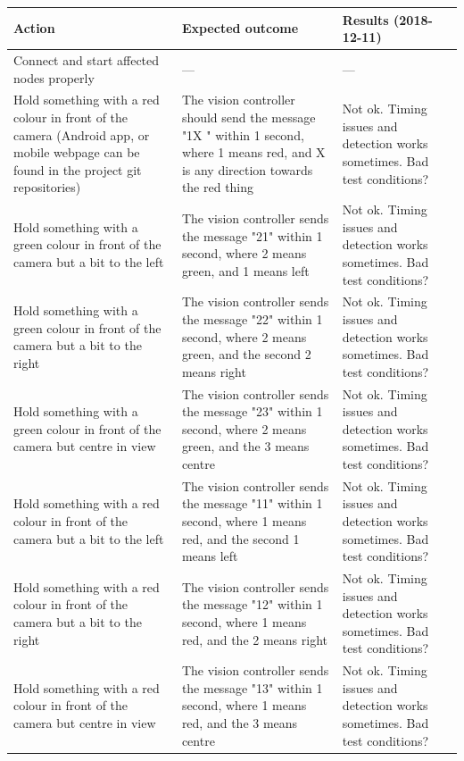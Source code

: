 \documentclass[11pt, titlepage]{article} %
\begin{document}
\begin{table}[H]
 \label{tab:title}
\centering
\begin{tabular}{|m{5cm}|m{5cm}|m{5cm}|}
\hline
Action & Expected outcome & Results (2018-12-11) \\ \hline
Connect and start affected nodes properly  &  ---     & ---  \\ \hline
Hold something with a red colour in front of the camera (Android app, or mobile webpage can be found in the project git repositories)  & The vision controller should send the message "1X " within 1 second, where 1 means red, and X is any direction towards the red thing      & Not ok. Timing issues and detection works sometimes. Bad test conditions?  \\ \hline
Hold something with a green colour in front of the camera but a bit to the left  & The vision controller sends the message "21" within 1 second, where 2 means green, and 1 means left      & Not ok. Timing issues and detection works sometimes. Bad test conditions?  \\ \hline
Hold something with a green colour in front of the camera but a bit to the right  & The vision controller sends the message "22" within 1 second, where 2 means green, and the second 2 means right     & Not ok. Timing issues and detection works sometimes. Bad test conditions?  \\ \hline
Hold something with a green colour in front of the camera but centre in view  & The vision controller sends the message "23" within 1 second, where 2 means green, and the 3 means centre      & Not ok. Timing issues and detection works sometimes. Bad test conditions?  \\ \hline
Hold something with a red colour in front of the camera but a bit to the left  & The vision controller sends the message "11" within 1 second, where 1 means red, and the second 1 means left      & Not ok. Timing issues and detection works sometimes. Bad test conditions?  \\ \hline
Hold something with a red colour in front of the camera but a bit to the right  & The vision controller sends the message "12" within 1 second, where 1 means red, and the 2 means right      & Not ok. Timing issues and detection works sometimes. Bad test conditions?  \\ \hline
Hold something with a red colour in front of the camera but centre in view  &  The vision controller sends the message "13" within 1 second, where 1 means red, and the 3 means centre     & Not ok. Timing issues and detection works sometimes. Bad test conditions?  \\ \hline

\end{tabular}
\end{table}
\end{document}
